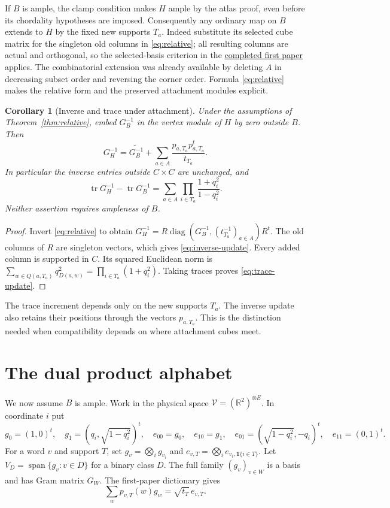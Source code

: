 \documentclass[11pt]{article}
\newtheorem{corollary}[theorem]{Corollary}
\theoremstyle{definition}
\begin{document}
If $B$ is ample, the clamp condition makes $H$ ample by the atlas proof,
even before its chordality hypotheses are imposed. Consequently any
ordinary map on $B$ extends to $H$ by the fixed new supports $T_a$.
Indeed substitute its selected cube matrix for the singleton old columns
in \eqref{eq:relative}; all resulting columns are actual and orthogonal,
so the selected-basis criterion in the
\href{../main.pdf}{completed first paper} applies. The combinatorial
extension was already available by deleting $A$ in decreasing subset order
and reversing the corner order. Formula \eqref{eq:relative} makes the
relative form and the preserved attachment modules explicit.

\begin{corollary}[Inverse and trace under attachment]\label{cor:relative-trace}
Under the assumptions of Theorem~\ref{thm:relative}, embed $G_B^{-1}$
in the vertex module of $H$ by zero outside $B$. Then
\begin{equation}\label{eq:inverse-update}
 G_H^{-1}=\widetilde{G_B^{-1}}+
          \sum_{a\in A}\frac{p_{a,T_a}p_{a,T_a}^{t}}{t_{T_a}}.
\end{equation}
In particular the inverse entries outside $C\times C$ are unchanged, and
\begin{equation}\label{eq:trace-update}
 \operatorname{tr}G_H^{-1}-\operatorname{tr}G_B^{-1}
   =\sum_{a\in A}\prod_{i\in T_a}\frac{1+q_i^2}{1-q_i^2}.
\end{equation}
Neither assertion requires ampleness of $B$.
\end{corollary}
\begin{proof}
Invert \eqref{eq:relative} to obtain
$G_H^{-1}=R\operatorname{diag}(G_B^{-1},(t_{T_a}^{-1})_{a\in A})R^t$.
The old columns of $R$ are singleton vectors, which gives
\eqref{eq:inverse-update}. Every added column is supported in $C$.
Its squared Euclidean norm is
$\sum_{w\in Q(a,T_a)}q_{D(a,w)}^2=\prod_{i\in T_a}(1+q_i^2)$.
Taking traces proves \eqref{eq:trace-update}.
\end{proof}

The trace increment depends only on the new supports $T_a$.
The inverse update also retains their positions through the vectors
$p_{a,T_a}$. This is the distinction needed when compatibility depends
on where attachment cubes meet.

\section{The dual product alphabet}
\label{sec:dual}
We now assume $B$ is ample. Work in the physical space
$\mathcal V=(\mathbb R^2)^{\otimes E}$. In coordinate $i$ put
\[
 g_0=(1,0)^t,\quad g_1=(q_i,\sqrt{1-q_i^2})^t,
 \quad e_{00}=g_0,\quad e_{10}=g_1,
 \quad e_{01}=(\sqrt{1-q_i^2},-q_i)^t,\quad e_{11}=(0,1)^t.
\]
For a word $v$ and support $T$, set
$g_v=\bigotimes_i g_{v_i}$ and
$e_{v,T}=\bigotimes_i e_{v_i,\mathbf1\{i\in T\}}$.
Let $V_D=\operatorname{span}\{g_v:v\in D\}$ for a binary class $D$.
The full family $(g_v)_{v\in W}$ is a basis and has Gram matrix $G_W$.
The first-paper dictionary gives
\begin{equation}\label{eq:cube-dictionary}
 \sum_w p_{v,T}(w)g_w=\sqrt{t_T}\,e_{v,T}.
\end{equation}
\end{document}
